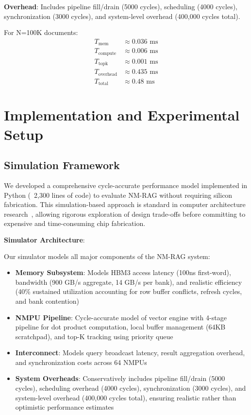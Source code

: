 \documentclass[conference]{IEEEtran}
\begin{document}
\textbf{Overhead}:
Includes pipeline fill/drain (5000 cycles), scheduling (4000 cycles), synchronization (3000 cycles), and system-level overhead (400,000 cycles total).

For N=100K documents:
\begin{align*}
T_{\text{mem}} &\approx 0.036\text{ ms} \\
T_{\text{compute}} &\approx 0.006\text{ ms} \\
T_{\text{topk}} &\approx 0.001\text{ ms} \\
T_{\text{overhead}} &\approx 0.435\text{ ms} \\
\hline
T_{\text{total}} &\approx 0.48\text{ ms}
\end{align*}

\section{Implementation and Experimental Setup}

\subsection{Simulation Framework}

We developed a comprehensive cycle-accurate performance model implemented in Python (~2,300 lines of code) to evaluate NM-RAG without requiring silicon fabrication. This simulation-based approach is standard in computer architecture research~\cite{binkert2011gem5}, allowing rigorous exploration of design trade-offs before committing to expensive and time-consuming chip fabrication.

\textbf{Simulator Architecture}:

Our simulator models all major components of the NM-RAG system:

\begin{itemize}
    \item \textbf{Memory Subsystem}: Models HBM3 access latency (100ns first-word), bandwidth (900 GB/s aggregate, 14 GB/s per bank), and realistic efficiency (40\% sustained utilization accounting for row buffer conflicts, refresh cycles, and bank contention)

    \item \textbf{NMPU Pipeline}: Cycle-accurate model of vector engine with 4-stage pipeline for dot product computation, local buffer management (64KB scratchpad), and top-K tracking using priority queue

    \item \textbf{Interconnect}: Models query broadcast latency, result aggregation overhead, and synchronization costs across 64 NMPUs

    \item \textbf{System Overheads}: Conservatively includes pipeline fill/drain (5000 cycles), scheduling overhead (4000 cycles), synchronization (3000 cycles), and system-level overhead (400,000 cycles total), ensuring realistic rather than optimistic performance estimates
\end{itemize}
\end{document}
